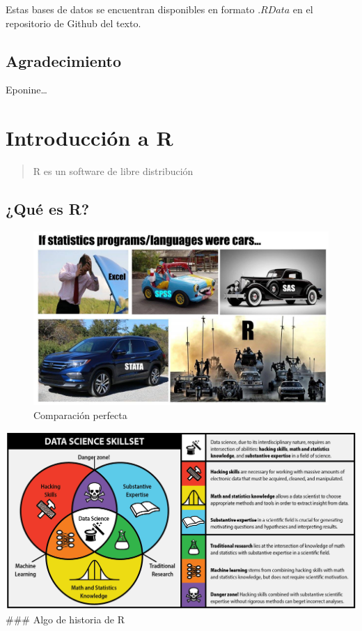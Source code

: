 \documentclass[
]{book}
\begin{document}
Estas bases de datos se encuentran disponibles en formato \(.RData\) en el repositorio de Github del texto.

\hypertarget{agradecimiento}{%
\section*{Agradecimiento}\label{agradecimiento}}

Eponine\ldots{}

\hypertarget{introR}{%
\chapter{Introducción a R}\label{introR}}

\begin{quote}
R es un software de libre distribución
\end{quote}

\hypertarget{quuxe9-es-r}{%
\section{¿Qué es R?}\label{quuxe9-es-r}}

\begin{figure}
\centering
\includegraphics{images/r.jpg}
\caption{Comparación perfecta}
\end{figure}

\includegraphics{images/ds.jpg}
\#\#\# Algo de historia de R
\end{document}
